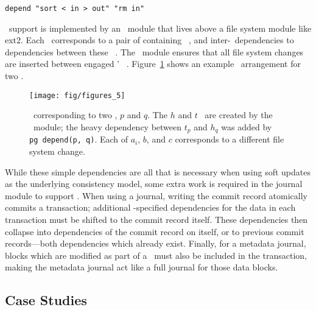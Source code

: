 \vspace{-0.5\baselineskip}
\begin{center}
\begin{small}
\verb+depend "sort < in > out" "rm in"+
\end{small}
\end{center}
\vspace{-0.5\baselineskip}


\Patchgroup\ support is implemented by an \LFS\ module that lives above a file
system module like ext2.
%
Each \patchgroup\ corresponds to a pair of containing \noop\ \patches,
and inter-\patchgroup\ dependencies to dependencies between these \noop\
\patches.
%
The \LFS\ module ensures that all file system changes are inserted
between engaged \patchgroups' \noop\ \patches.
%
Figure~\ref{fig:patchgroup-patches} shows an example \patch\ arrangement for
two \patchgroups.

\begin{figure}[t]
\centering
\texttt{[image: fig/figures\_5]}
\caption{\label{fig:patchgroup-patches} \Patches\ corresponding to two
  \patchgroups, $p$ and $q$.  The $h$ and $t$ \patches\ are created by the 
  \patchgroup\ module; the heavy dependency between $t_p$ and $h_q$ was added
  by \texttt{pg~depend(p, q)}.  Each of $a_i$, $b$, and $c$ corresponds to
  a different file system change.}
\end{figure}

While these simple dependencies are all that is necessary when using soft
updates as the underlying consistency model, some extra work is required in the
journal module to support \patchgroups.
%
When using a journal, writing the commit record atomically commits a
transaction; additional \patchgroup-specified dependencies for the data in each
transaction must be shifted to the commit record itself.
%
These dependencies then collapse into dependencies of the commit record on
itself, or to previous commit records---both dependencies which already exist.
%
Finally, for a metadata journal, blocks which are modified as part of a
\patchgroup\ must also be included in the transaction, making the metadata
journal act like a full journal for those data blocks.

\subsection{Case Studies}
\label{sec:patchgroup:casestudies}


